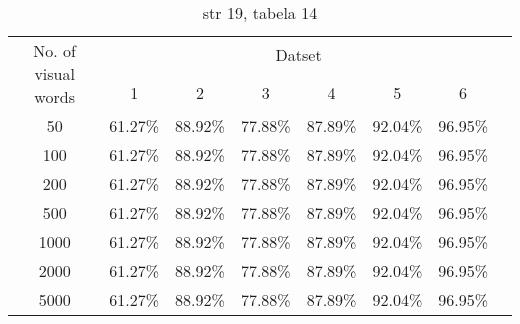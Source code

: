 \documentclass{article}
\begin{document}
\begin{table}
	\centering
		\begin{tabular}{|c|c|c|c|c|c|c|c}
			\hline
			\multirow{2}{*}{No. of visual words} & \multicolumn{6}{c|}{Datset} \\ \cline{2-7} & 1 & 2 & 3 & 4 & 5 & 6 \\ \hline
			50 & 61.27\% & 88.92\% & 77.88\% & 87.89\% & 92.04\% & 96.95\% \\ 
			100 & 61.27\% & 88.92\% & 77.88\% & 87.89\% & 92.04\% & 96.95\% \\
			200 & 61.27\% & 88.92\% & 77.88\% & 87.89\% & 92.04\% & 96.95\% \\
			500 & 61.27\% & 88.92\% & 77.88\% & 87.89\% & 92.04\% & 96.95\% \\
			1000 & 61.27\% & 88.92\% & 77.88\% & 87.89\% & 92.04\% & 96.95\% \\
			2000 & 61.27\% & 88.92\% & 77.88\% & 87.89\% & 92.04\% & 96.95\% \\
			5000 & 61.27\% & 88.92\% & 77.88\% & 87.89\% & 92.04\% & 96.95\% \\
			\hline
		\end{tabular}
	\caption{str 19, tabela 14}
	\label{tab:dane}
\end{table}

\end{document}
